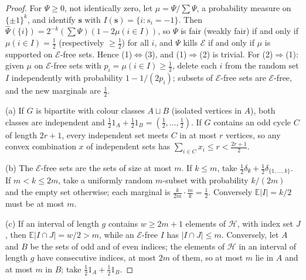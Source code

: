 \documentclass[11pt]{amsart}
\theoremstyle{definition}
\theoremstyle{remark}
\begin{document}
\begin{proof}
For $\Psi\ge0$, not identically zero, let $\mu=\Psi/\sum\Psi$, a probability
measure on $\{\pm1\}^k$, and identify $\mathbf s$ with
$I(\mathbf s)=\{i:s_i=-1\}$. Then
$\widehat\Psi(\{i\})=2^{-k}\left(\sum\Psi\right)\left(1-2\mu(i\in I)\right)$, so
$\Psi$ is fair (weakly fair) if and only if $\mu(i\in I)=\tfrac12$
(respectively $\ge\tfrac12$) for all $i$, and $\Psi$ kills $\mathcal E$ if and
only if $\mu$ is supported on $\mathcal E$-free sets. Hence
(1)$\Leftrightarrow$(3), and (1)$\Rightarrow$(2) is trivial. For
(2)$\Rightarrow$(1): given $\mu$ on $\mathcal E$-free sets with
$p_i=\mu(i\in I)\ge\tfrac12$, delete each $i$ from the random set $I$
independently with probability $1-1/(2p_i)$; subsets of $\mathcal E$-free sets
are $\mathcal E$-free, and the new marginals are $\tfrac12$.

(a) If $G$ is bipartite with colour classes $A\sqcup B$ (isolated vertices in
$A$), both classes are independent and $\tfrac12 1_A+\tfrac12 1_B=(\tfrac12,
\dots,\tfrac12)$. If $G$ contains an odd cycle $C$ of length $2r+1$, every
independent set meets $C$ in at most $r$ vertices, so any convex combination
$x$ of independent sets has $\sum_{i\in C}x_i\le r<\tfrac{2r+1}2$.

(b) The $\mathcal E$-free sets are the sets of size at most $m$. If $k\le m$,
take $\tfrac12\delta_{\emptyset}+\tfrac12\delta_{\{1,\dots,k\}}$. If $m<k\le2m$,
take a uniformly random $m$-subset with probability $k/(2m)$ and the empty set
otherwise; each marginal is $\tfrac{k}{2m}\cdot\tfrac mk=\tfrac12$. Conversely
$\mathbb E|I|=k/2$ must be at most $m$.

(c) If an interval of length $g$ contains $w\ge 2m+1$ elements of
$\mathcal H$, with index set $J$, then $\mathbb E|I\cap J|=w/2>m$, while an
$\mathcal E$-free $I$ has $|I\cap J|\le m$. Conversely, let $A$ and $B$ be the
sets of odd and of even indices; the elements of $\mathcal H$ in an interval
of length $g$ have consecutive indices, at most $2m$ of them, so at most $m$
lie in $A$ and at most $m$ in $B$; take $\tfrac12 1_A+\tfrac12 1_B$.
\end{proof}
\end{document}
